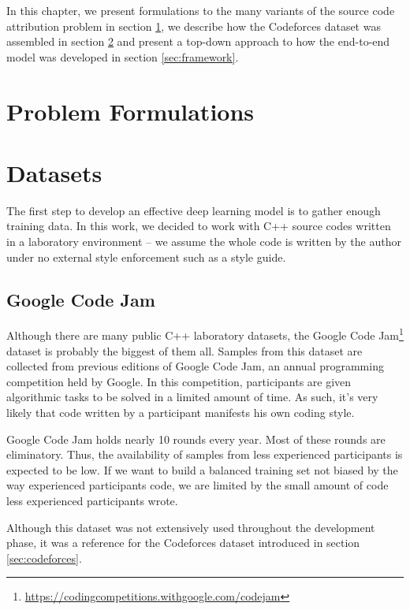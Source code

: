 
In this chapter, we present formulations to the many variants of the source code attribution problem in section \ref{sec:formulations}, we describe how the Codeforces dataset was assembled in section \ref{sec:dataset} and present a top-down approach to how the end-to-end model was developed in section \ref{sec:framework}.

\section{Problem Formulations}\label{sec:formulations}
\section{Datasets}\label{sec:dataset}

The first step to develop an effective deep learning model is to gather enough training data. In this work, we decided to work with C++ source codes written in a laboratory environment -- we assume the whole code is written by the author under no external style enforcement such as a style guide.

\subsection{Google Code Jam}

Although there are many public C++ laboratory datasets, the Google Code Jam\footnote{\url{https://codingcompetitions.withgoogle.com/codejam}} dataset \cite{caliskan_2015} is probably the biggest of them all. Samples from this dataset are collected from previous editions of Google Code Jam, an annual programming competition held by Google. In this competition, participants are given algorithmic tasks to be solved in a limited amount of time. As such, it's very likely that code written by a participant manifests his own coding style.

Google Code Jam holds nearly 10 rounds every year. Most of these rounds are eliminatory. Thus, the availability of samples from less experienced participants is expected to be low. If we want to build a balanced training set not biased by the way experienced participants code, we are limited by the small amount of code less experienced participants wrote.

Although this dataset was not extensively used throughout the development phase, it was a reference for the Codeforces dataset introduced in section \ref{sec:codeforces}.

